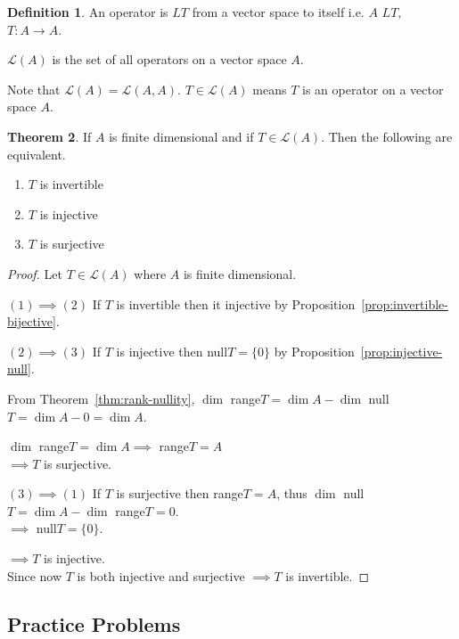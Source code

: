 \documentclass[11pt,a4paper]{article}
\theoremstyle{definition}
\newtheorem{thm}{Theorem}[subsection]
\newtheorem{defn}[thm]{Definition}
\begin{document}
\begin{defn}
An operator is $LT$ from a vector space to itself i.e. $A$ $LT,$ $T:A\longrightarrow A$.

$\mathcal{L}(A)$ is the set of all operators on a vector space $A$.

Note that $\mathcal{L}(A)=\mathcal{L}(A,A)$. $T\in \mathcal{L}(A)$ means $T$ is an operator on a vector space $A$.
\end{defn}


\begin{thm}
If $A$ is finite dimensional and if $T\in \mathcal{L}(A)$. Then the following are equivalent.
\begin{enumerate}
\item $T$ is invertible
\item $T$ is injective
\item $T$ is surjective
\end{enumerate}
\end{thm}


\begin{proof}
Let $T\in \mathcal{L}(A)$ where $A$  is finite dimensional.

$(1)\implies (2)$ If $T$ is invertible then it injective by Proposition~\ref{prop:invertible-bijective}.

$(2)\implies (3)$ If $T$ is injective then null$T=\{0\}$ by Proposition~\ref{prop:injective-null}.

From Theorem~\ref{thm:rank-nullity}, $\dim$ range$T=\dim A-\dim$ null$T=\dim A-0=\dim A$.

$\dim$ range$T=\dim A\implies $ range$T=A$\\$\implies T$ is surjective.

$(3)\implies (1)$ If $T$ is surjective then range$T=A$, thus $\dim$ null$T=\dim A-\dim$ range$T=0$.\\$\implies$ null$T=\{0\}$.

$\implies T$ is injective.\\ Since now $T$ is both injective and surjective $\implies T$ is invertible.


\end{proof}

\subsection{Practice Problems}
\end{document}
